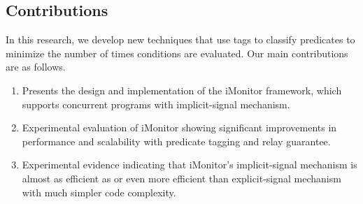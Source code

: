 \documentclass[preprint]{sigplanconf}
\begin{document}
\subsection{Contributions}
In this research, we develop new techniques that use tags to classify 
predicates to minimize the number of times conditions are evaluated.
Our main contributions are as follows.
\begin{enumerate}
    \item Presents the design and implementation of the iMonitor framework,
        which supports concurrent programs with implicit-signal mechanism.
    \item Experimental evaluation of iMonitor showing significant
        improvements in performance and scalability with predicate tagging
        and relay guarantee. 
    \item Experimental evidence indicating that iMonitor's implicit-signal
        mechanism is almost as efficient as or even more efficient
        than explicit-signal mechanism with much simpler code complexity.
\end{enumerate}

\end{document}
